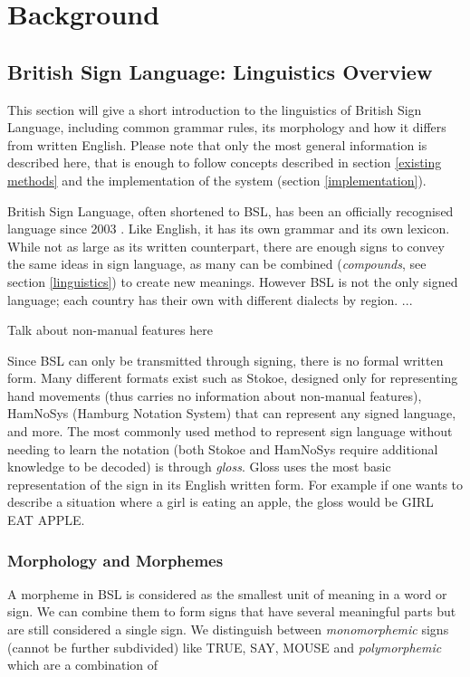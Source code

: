 \documentclass[12pt]{ociamthesis}  %
\begin{document}

\chapter{Background}
\section{British Sign Language: Linguistics Overview}
This section will give a short introduction to the linguistics of British Sign Language, including common grammar rules, its morphology and how it differs from written English. Please note that only the most general information is described here, that is enough to follow concepts described in section \ref{existing methods} and the implementation of the system (section \ref{implementation}).

British Sign Language, often shortened to BSL, has been an officially recognised language since 2003 . Like English, it has its own grammar  and its own lexicon. While not as large as its written counterpart, there are enough signs to convey the same ideas in sign language, as many can be combined (\textit{compounds}, see section \ref{linguistics}) to create new meanings. However BSL is not the only signed language; each country has their own with different dialects by region. ...  

Talk about non-manual features here

Since BSL can only be transmitted through signing, there is no formal written form. Many different formats exist such as Stokoe, designed only for representing hand movements (thus carries no information about non-manual features), HamNoSys (Hamburg Notation System) that can represent any signed language, and more. The most commonly used method to represent sign language without needing to learn the notation (both Stokoe and HamNoSys require additional knowledge to be decoded) is through \textit{gloss}. Gloss uses the most basic representation of the sign in its English written form. For example if one wants to describe a situation where a girl is eating an apple, the gloss would be GIRL EAT APPLE. 

\subsection{Morphology and Morphemes}
A morpheme in BSL is considered as the smallest unit of meaning in a word or sign. We can combine them to form signs that have several meaningful parts but are still considered a single sign. We distinguish between \textit{monomorphemic} signs (cannot be further subdivided) like TRUE, SAY, MOUSE and \textit{polymorphemic} which are a combination of 
\end{document}
